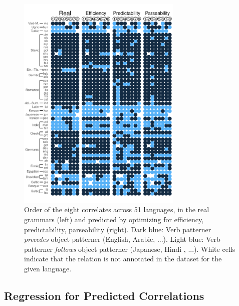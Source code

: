 \documentclass[10pt,twoside,lineno]{article}
\begin{document}
\begin{figure} 
	\begin{center}
	\includegraphics[width=0.7\textwidth]{../results/correlations/figures/pred-eff-pred-pars-families-2.pdf} 
	\end{center}
	\caption{Order of the eight correlates across 51 languages, in the real grammars (left) and predicted by optimizing for efficiency, predictability, parseability (right). Dark blue: Verb patterner \emph{precedes} object patterner (English, Arabic, ...). Light blue: Verb patterner \emph{follows} object patterner (Japanese, Hindi , ...). White cells indicate that the relation is not annotated in the dataset for the given language.}\label{fig:per-lang}
\end{figure}

\subsection{Regression for Predicted Correlations}\label{sec:study2-regression}


\end{document}
